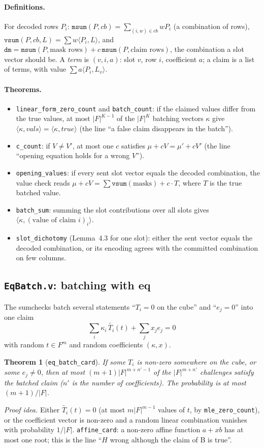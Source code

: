 \documentclass[11pt,a4paper]{article}
\newcommand{\ip}[2]{\langle #1, #2\rangle}
\newcommand{\mle}[1]{\widetilde{#1}}
\theoremstyle{definition}
\theoremstyle{plain}
\newtheorem{theorem}[definition]{Theorem}
\begin{document}
\paragraph{Definitions.} For decoded rows $P_i$:
$\mathtt{msum}(P,cb)=\sum_{(i,w)\in cb}wP_i$ (a combination of rows),
$\mathtt{vsum}(P,cb,L)=\sum w\ip{P_i}{L}$, and $\mathtt{dm}=\mathtt{msum}(P,\text{mask rows})+c\,\mathtt{msum}(P,\text{claim rows})$,
the combination a slot vector should be. A \emph{term} is $(v,i,a)$: slot $v$, row $i$, coefficient
$a$; a claim is a list of terms, with value $\sum a\ip{P_i}{L_v}$.
\paragraph{Theorems.}
\begin{itemize}[leftmargin=1.3em]
\item \texttt{linear\_form\_zero\_count} and \texttt{batch\_count}: if the claimed values differ from
  the true values, at most $|F|^{K-1}$ of the $|F|^K$ batching vectors $\kappa$ give
  $\ip{\kappa}{\mathit{vals}}=\ip{\kappa}{\mathit{true}}$ (the line ``a false claim disappears in the
  batch'').
\item \texttt{c\_count}: if $V\ne V'$, at most one $c$ satisfies $\mu+cV=\mu'+cV'$ (the line ``opening
  equation holds for a wrong $V$'').
\item \texttt{opening\_values}: if every sent slot vector equals the decoded combination, the value
  check reads $\mu+cV=\sum\mathtt{vsum}(\text{masks})+c\cdot T$, where $T$ is the true batched value.
\item \texttt{batch\_sum}: summing the slot contributions over all slots gives
  $\ip{\kappa}{(\text{value of claim } i)_i}$.
\item \texttt{slot\_dichotomy} (Lemma~4.3 for one slot): either the sent vector equals the decoded
  combination, or its encoding agrees with the committed combination on few columns.
\end{itemize}

\subsection{\texttt{EqBatch.v}: batching with eq}

The sumchecks batch several statements ``$T_i=0$ on the cube'' and ``$e_j=0$'' into one claim
\[
  \sum_i\kappa_i\,\mle{T_i}(t)+\sum_jx_je_j=0
\]
with random $t\in F^m$ and random coefficients $(\kappa,x)$.
\begin{theorem}[\texttt{eq\_batch\_card}]
If some $T_i$ is non-zero somewhere on the cube, or some $e_j\ne0$, then at most
$(m+1)|F|^{m+n'-1}$ of the $|F|^{m+n'}$ challenges satisfy the batched claim ($n'$ is the number of
coefficients). The probability is at most $(m+1)/|F|$.
\end{theorem}
\emph{Proof idea.} Either $\mle{T_i}(t)=0$ (at most $m|F|^{m-1}$ values of $t$, by
\texttt{mle\_zero\_count}), or the coefficient vector is non-zero and a random linear combination
vanishes with probability $1/|F|$. \texttt{affine\_card}: a non-zero affine function $a+xb$ has at
most one root; this is the line ``$H$ wrong although the claim of B is true''.
\end{document}
